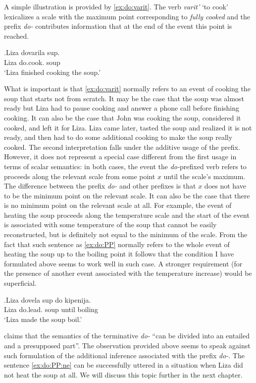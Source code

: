 A simple illustration is provided by \ref{ex:do:varit}. The verb \textit{varit'} `to cook' lexicalizes a scale with the maximum point corresponding to \textit{fully cooked} and the prefix \textit{do-} contributes information that at the end of the event this point is reached. 

\exg.\label{ex:do:varit}Liza dovarila sup.\\
Liza do.cook. soup\\
\trans `Liza finished cooking the soup.'

What is important is that \ref{ex:do:varit} normally refers to an event of cooking the soup that starts not from scratch. It may be the case that the soup was almost ready but Liza had to pause cooking and answer a phone call before finishing cooking. It can also be the case that John was cooking the soup, considered it cooked, and left it for Liza. Liza came later, tasted the soup and realized it is not ready, and then had to do some additional cooking to make the soup really cooked. The second interpretation falls under the additive usage of the prefix. However, it does not represent a special case different from the first usage in terms of scalar semantics: in both cases, the event the \textit{do-}prefixed verb refers to proceeds along the relevant scale from some point $x$ until the scale's maximum. The difference between the prefix \textit{do-} and other prefixes is that $x$ does not have to be the minimum point on the relevant scale. It can also be the case that there is no minimum point on the relevant scale at all. For example, the event of heating the soup proceeds along the temperature scale and the start of the event is associated with some temperature of the soup that cannot be easily reconstructed, but is definitely not equal to the minimum of the scale. From the fact that such sentence as \ref{ex:do:PP} normally refers to the whole event of heating the soup up to the boiling point it follows that the condition I have formulated above seems to work well in such case. A stronger requirement (for the presence of another event associated with the temperature increase) would be superficial.

\exg.\label{ex:do:PP}Liza dovela sup do kipenija.\\
Liza do.lead. soup until boiling\\
\trans `Liza made the soup boil.'

\citet[75]{Kagan:book} claims that the semantics of the terminative \textit{do-} ``can be divided into an entailed and a presupposed part''. The observation provided above seems to speak against such formulation of the additional inference associated with the prefix \textit{do-}. The sentence \ref{ex:do:PP:ne} can be successfully uttered in a situation when Liza did not heat the soup at all. We will discuss this topic further in the next chapter.

